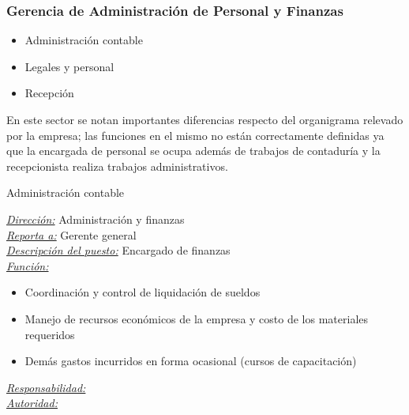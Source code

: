 \documentclass[a4paper,10pt,titlepage]{article}
\begin{document}
\subsubsection{Gerencia de Administraci\'on de Personal y Finanzas}

 \begin{itemize}
   \item Administraci\'on contable
   \item Legales y personal
   \item Recepci\'on
 \end{itemize}
 En este sector se notan importantes diferencias respecto del organigrama relevado por la empresa; las funciones en el mismo no est\'an correctamente definidas ya que la encargada de personal se ocupa adem\'as de trabajos de contaduría y la recepcionista realiza trabajos administrativos.
 \bigskip
 \bigskip
     \begin{description}
     \item[Administraci\'on contable] 
     \end{description}
      \underline{\textit{Direcci\'on:}}  Administraci\'on y finanzas \\
      \underline{\textit{Reporta a:}} Gerente general \\
      \underline{\textit{Descripci\'on del puesto:}} Encargado de finanzas
      \bigskip
      \bigskip
      \\
      \underline{\textit{Funci\'on:}} \\
        \begin{itemize}
        \item Coordinaci\'on y control de liquidaci\'on de sueldos
        \item Manejo de recursos econ\'omicos de la empresa y costo de los materiales requeridos
        \item Dem\'as gastos incurridos en forma ocasional (cursos de capacitaci\'on)
        \end{itemize}
      \underline{\textit{Responsabilidad:}} \\
      \underline{\textit{Autoridad:}} \\
      \bigskip
\end{document}
